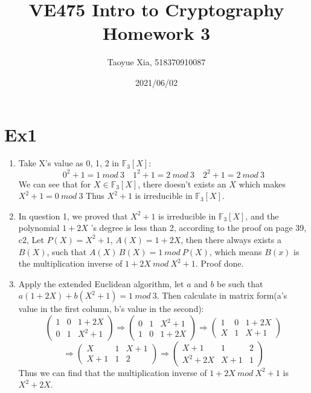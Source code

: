 \documentclass[12pt, a4paper]{article}
\begin{document}
\title{VE475 Intro to Cryptography Homework 3}
\author{Taoyue Xia, 518370910087}
\date{2021/06/02}
\maketitle

\section{Ex1}
\begin{enumerate}
    \item Take X's value as 0, 1, 2 in $\mathbb{F}_3[X]$:
          $$0^2 + 1 = 1\ mod\ 3 \quad 1^2 + 1 = 2\ mod\ 3 \quad 2^2 + 1 = 2\ mod\ 3$$
          We can see that for $X \in \mathbb{F}_3[X]$, there doesn't exists an $X$ which makes $X^2 + 1 = 0\ mod\ 3$\newline
          Thus $X^2 + 1$ is irreducible in $\mathbb{F}_3[X]$.
    \item In question 1, we proved that $X^2 + 1$ is irreducible in $\mathbb{F}_3[X]$, 
          and the polynomial $1 + 2X$ 's degree is less than 2, according to the proof on page 39, c2, 
          Let $P(X) = X^2 + 1$, $A(X) = 1 + 2X$, then there always exists a $B(X)$, such that
          $A(X)\, B(X) = 1\ mod\ P(X)$, which means $B(x)$ is the multiplication inverse of $1 + 2X\ mod\ X^2 + 1$. 
          Proof done.
    \item Apply the extended Euclidean algorithm, let $a$ and $b$ be such that $a(1 + 2X) + b(X^2 + 1) = 1\ mod\ 3$.
          Then calculate in matrix form(a's value in the first column, b's value in the second):\newline
          $$
          \begin{pmatrix} 1 & 0 & 1 + 2X\\ 0 & 1 & X^2 + 1 \end{pmatrix}
          \Rightarrow \begin{pmatrix} 0 & 1 & X^2 + 1\\ 1 & 0 & 1 + 2X \end{pmatrix}
          \Rightarrow \begin{pmatrix} 1 & 0 & 1 + 2X\\ X & 1 & X + 1 \end{pmatrix}
          $$
          $$
          \Rightarrow \begin{pmatrix} X & 1 & X + 1\\ X + 1 & 1 & 2 \end{pmatrix}
          \Rightarrow \begin{pmatrix} X + 1 & 1 & 2\\ X^2 + 2X & X + 1 & 1 \end{pmatrix}
          $$
          Thus we can find that the multiplication inverse of $1 + 2X\ mod\ X^2 + 1$ is $X^2 + 2X$.

\end{enumerate}
\end{document}
